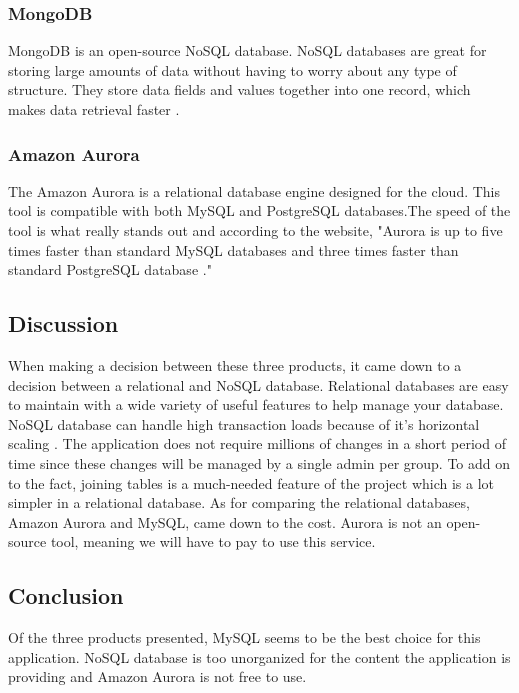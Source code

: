 \documentclass[onecolumn, draftclsnofoot,10pt, compsoc]{IEEEtran}
\begin{document}
\subsubsection{MongoDB}

MongoDB is an open-source NoSQL database. NoSQL databases are great for storing large amounts of data without having to worry about any type of structure. They store data fields and values together into one record, which makes data retrieval faster \cite{MySQLvsMongo}.

\subsubsection{Amazon Aurora}

The Amazon Aurora is a relational database engine designed for the cloud. This tool is compatible with both MySQL and PostgreSQL databases.The speed of the tool is what really stands out and according to the website, "Aurora is up to five times faster than standard MySQL databases and three times faster than standard PostgreSQL database \cite{Amazon}."

\subsection{Discussion}

When making a decision between these three products, it came down to a decision between a relational and NoSQL database. Relational databases are easy to maintain with a wide variety of useful features to help manage your database. NoSQL database can handle high transaction loads because of it's horizontal scaling \cite{MySQLvsMongo}. The application does not require millions of changes in a short period of time since these changes will be managed by a single admin per group. To add on to the fact, joining tables is a much-needed feature of the project which is a lot simpler in a relational database. As for comparing the relational databases, Amazon Aurora and MySQL, came down to the cost. Aurora is not an open-source tool, meaning we will have to pay to use this service.

\subsection{Conclusion}

Of the three products presented, MySQL seems to be the best choice for this application. NoSQL database is too unorganized for the content the application is providing and Amazon Aurora is not free to use. 
\end{document}
